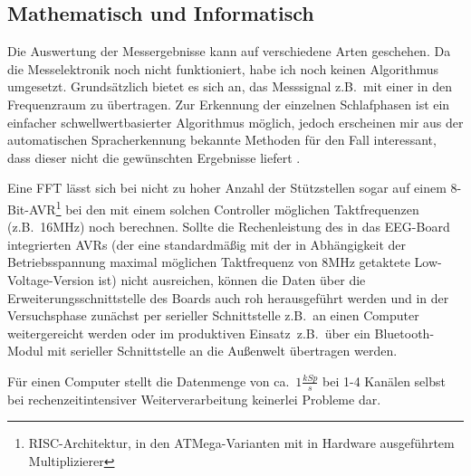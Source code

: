 \documentclass[12pt,a4paper,notitlepage]{article}
\begin{document}
\subsection{Mathematisch und Informatisch}
Die Auswertung der Messergebnisse kann auf verschiedene Arten geschehen. Da die Messelektronik noch nicht funktioniert, habe ich noch keinen Algorithmus umgesetzt.
Grundsätzlich bietet es sich an, das Messsignal z.B.\ mit einer  in den Frequenzraum zu übertragen. Zur Erkennung der einzelnen Schlafphasen ist ein einfacher schwellwertbasierter Algorithmus möglich, jedoch erscheinen mir aus der automatischen Spracherkennung bekannte Methoden für den Fall interessant, dass dieser nicht die gewünschten Ergebnisse liefert
\cite{WP2,WP11,WP12,WP13}.

Eine FFT lässt sich bei nicht zu hoher Anzahl der Stützstellen sogar auf einem 8-Bit-AVR\footnote{RISC-Architektur, in den \glqq ATMega\grqq-Varianten mit in Hardware ausgeführtem Multiplizierer} bei den mit einem solchen Controller möglichen Taktfrequenzen (z.B.\ 16MHz) noch berechnen\cite{LOMBARD1}. Sollte die Rechenleistung des in das EEG-Board integrierten AVRs (der eine standardmäßig mit der in Abhängigkeit der Betriebsspannung maximal möglichen Taktfrequenz von 8MHz getaktete Low-Voltage-Version ist) nicht ausreichen, können die Daten über die Erweiterungsschnittstelle des Boards auch roh herausgeführt werden und in der Versuchsphase zunächst per serieller Schnittstelle z.B.\ an einen Computer weitergereicht werden oder im \glqq produktiven Einsatz\grqq\ z.B.\ über ein Bluetooth-Modul mit serieller Schnittstelle an die Außenwelt übertragen werden.

Für einen Computer stellt die Datenmenge von ca.\ $1\frac{kSp}{s}$ bei 1-4 Kanälen selbst bei rechenzeitintensiver Weiterverarbeitung keinerlei Probleme dar.
\end{document}
